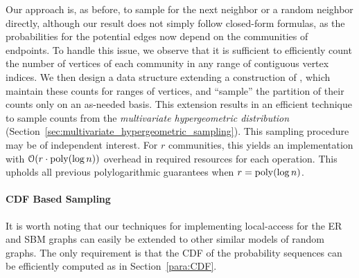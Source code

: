 Our approach is, as before, to sample for the next neighbor or a random neighbor directly,
although our result does not simply follow closed-form formulas,
as the probabilities for the potential edges now depend
on the communities of endpoints.
To handle this issue, we observe that it is sufficient to efficiently count
the number of vertices of each community in any
range of contiguous vertex indices.
We then design a data structure extending a construction of \cite{huge},
which maintain these counts for ranges of vertices,
and ``sample'' the partition of their counts only on an as-needed basis.
This extension results in an efficient technique to sample counts
from the \emph{multivariate hypergeometric distribution} (Section~\ref{sec:multivariate_hypergeometric_sampling}).
This sampling procedure may be of independent interest.
For $r$ communities, this yields an implementation with
$ \mathcal{O}(r\cdot \mathrm{poly}(\log n))$ overhead in required resources for each operation.
This upholds all previous polylogarithmic guarantees when $r = \mathrm{poly}(\log n)$.

\paragraph*{CDF Based Sampling}
It is worth noting that our techniques for implementing local-access for the ER and SBM graphs
can easily be extended to other similar models of random graphs.
The only requirement is that the CDF of the probability sequences can be efficiently computed as in Section~\ref{para:CDF}.
